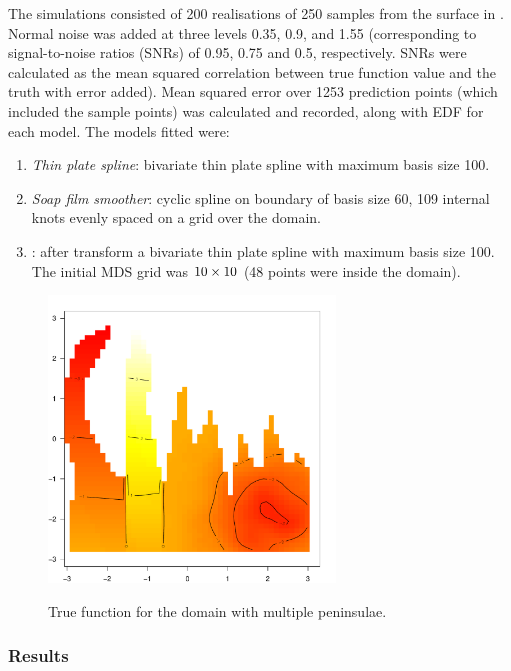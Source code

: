 The simulations consisted of 200 realisations of 250 samples from the surface in . Normal noise was added at three levels  0.35, 0.9, and 1.55 (corresponding to signal-to-noise ratios (SNRs) of 0.95, 0.75 and 0.5, respectively. SNRs were calculated as the mean squared correlation between true function value and the truth with error added). Mean squared error over 1253 prediction points (which included the sample points) was calculated and recorded, along with EDF for each model. The models fitted were:
\begin{enumerate}
\item \emph{Thin plate spline}: bivariate thin plate spline with maximum basis size 100. 
\item \emph{Soap film smoother}: cyclic spline on boundary of basis size 60, 109 internal knots evenly spaced on a grid over the domain.
\item \emph{\mdsap}: after transform a bivariate thin plate spline with maximum basis size 100. The initial MDS grid was $10 \times 10$ (48 points were inside the domain).
\end{enumerate} 

\begin{figure}
\centering
\includegraphics[width=3in]{mds/figs/wt2-truth.pdf} \\
\caption{True function for the domain with multiple peninsulae.}
\label{wt2-truth}
\end{figure}

\subsubsection{Results}

